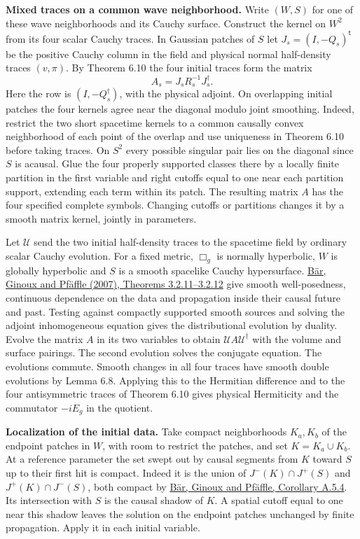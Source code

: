\documentclass[
  english,
  11pt,
  reqno]{amsart}
\begin{document}
\textbf{Mixed traces on a common wave neighborhood.} Write \((W,S)\) for
one of these wave neighborhoods and its Cauchy surface. Construct the
kernel on \(W^2\) from its four scalar Cauchy traces. In Gaussian
patches of \(S\) let \(J_s=(I,-Q_s)^{\mathsf t}\) be the positive Cauchy
column in the field and physical normal half-density traces \((v,\pi)\).
By Theorem 6.10 the four initial traces form the matrix \[
A_s=J_s R_s^{-1}J_s^\dagger .
\] Here the row is \((I,-Q_s^\dagger)\), with the physical adjoint. On
overlapping initial patches the four kernels agree near the diagonal
modulo joint smoothing. Indeed, restrict the two short spacetime kernels
to a common causally convex neighborhood of each point of the overlap
and use uniqueness in Theorem 6.10 before taking traces. On \(S^2\)
every possible singular pair lies on the diagonal since \(S\) is
acausal. Glue the four properly supported classes there by a locally
finite partition in the first variable and right cutoffs equal to one
near each partition support, extending each term within its patch. The
resulting matrix \(A\) has the four specified complete symbols. Changing
cutoffs or partitions changes it by a smooth matrix kernel, jointly in
parameters.

Let \(\mathcal U\) send the two initial half-density traces to the
spacetime field by ordinary scalar Cauchy evolution. For a fixed metric,
\(\Box_g\) is normally hyperbolic, \(W\) is globally hyperbolic and
\(S\) is a smooth spacelike Cauchy hypersurface.
\hyperref[ref-BarGinouxPfaffle2007]{Bär, Ginoux and Pfäffle (2007),
Theorems 3.2.11--3.2.12} give smooth well-posedness, continuous
dependence on the data and propagation inside their causal future and
past. Testing against compactly supported smooth sources and solving the
adjoint inhomogeneous equation gives the distributional evolution by
duality. Evolve the matrix \(A\) in its two variables to obtain
\(\mathcal U A\mathcal U^\dagger\) with the volume and surface pairings.
The second evolution solves the conjugate equation. The evolutions
commute. Smooth changes in all four traces have smooth double evolutions
by Lemma 6.8. Applying this to the Hermitian difference and to the four
antisymmetric traces of Theorem 6.10 gives physical Hermiticity and the
commutator \(-iE_g\) in the quotient.

\textbf{Localization of the initial data.} Take compact neighborhoods
\(K_a,K_b\) of the endpoint patches in \(W\), with room to restrict the
patches, and set \(K=K_a\cup K_b\). At a reference parameter the set
swept out by causal segments from \(K\) toward \(S\) up to their first
hit is compact. Indeed it is the union of \(J^-(K)\cap J^+(S)\) and
\(J^+(K)\cap J^-(S)\), both compact by
\hyperref[ref-BarGinouxPfaffle2007]{Bär, Ginoux and Pfäffle, Corollary
A.5.4}. Its intersection with \(S\) is the causal shadow of \(K\). A
spatial cutoff equal to one near this shadow leaves the solution on the
endpoint patches unchanged by finite propagation. Apply it in each
initial variable.
\end{document}
